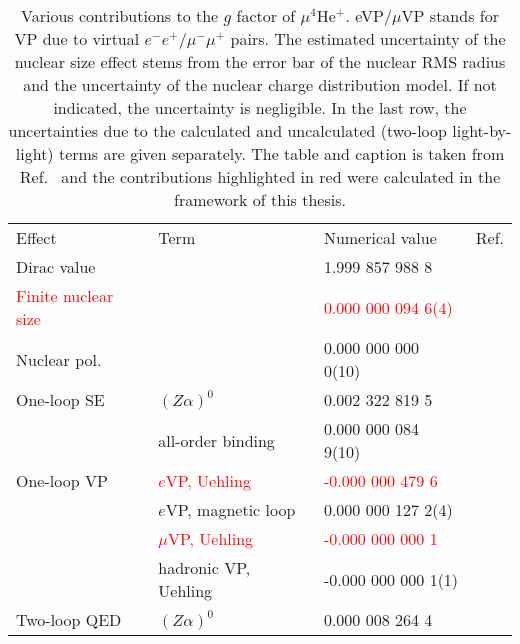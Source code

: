 \begin{table}
\setlength\extrarowheight{7pt}
\caption{\label{tab:gHe}Various contributions to the $g$ factor of $\mu{}^4$He$^+$. {eVP}/{$\mu$VP} stands for VP due to virtual $e^-e^+$/$\mu^- \mu^+$ pairs. The estimated uncertainty of the nuclear size
effect stems from the error bar of the nuclear RMS radius and the uncertainty of the nuclear charge distribution model. If not indicated, the uncertainty is negligible.
In the last row, the uncertainties due to the calculated and uncalculated (two-loop light-by-light) terms are given separately. The table and caption is taken from Ref.~\cite{sikora2018} and the contributions highlighted in red were calculated in the framework of this thesis.
}
\centering
\begin{footnotesize}
\begin{tabular}{llll}
\hline \\[-15pt] \hline
Effect                  & Term                  & Numerical value                 & Ref. \\
\hline
Dirac value             &                       & \phantom{-}1.999 857 988 8      & \cite{breit1928,codata} \\
\textcolor{red}{Finite nuclear size}     &                       & \textcolor{red}{\phantom{-}0.000 000 094 6(4)}   & \cite{Angeli2013} \\
Nuclear pol.    &                       & \phantom{-}0.000 000 000 0(10)  &  \\
One-loop SE             & $(Z \alpha)^0$        & \phantom{-}0.002 322 819 5      & \cite{schwinger1948,codata} \\
                        & all-order binding     & \phantom{-}0.000 000 084 9(10)  & \\
One-loop VP             & \textcolor{red}{$e$VP, Uehling}        & \textcolor{red}{-0.000 000 479 6}                &  \\
                        & $e$VP, magnetic loop  & \phantom{-}0.000 000 127 2(4)   & \\
                        & \textcolor{red}{$\mu$VP, Uehling}      &           \textcolor{red}{-0.000 000 000 1}      & \\
                        & hadronic VP, Uehling  &           -0.000 000 000 1(1)   & \\
Two-loop QED            &  $(Z \alpha)^0$       & \phantom{-}0.000 008 264 4      &  \cite{Peterman57,Sommerfield58} \\

\end{tabular}
\end{footnotesize}
\end{table}
